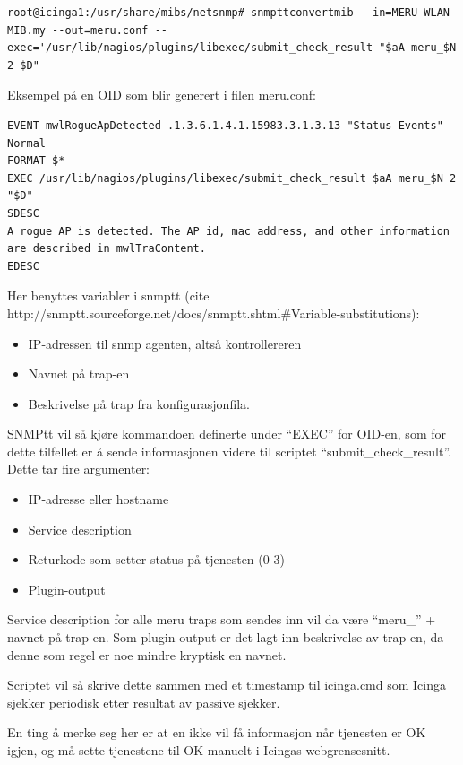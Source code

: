 \begin{lstlisting}
root@icinga1:/usr/share/mibs/netsnmp# snmpttconvertmib --in=MERU-WLAN-MIB.my --out=meru.conf --exec='/usr/lib/nagios/plugins/libexec/submit_check_result "$aA meru_$N 2 $D"
\end{lstlisting}

Eksempel på en OID som blir generert i filen meru.conf:

\begin{lstlisting}
EVENT mwlRogueApDetected .1.3.6.1.4.1.15983.3.1.3.13 "Status Events" Normal
FORMAT $*
EXEC /usr/lib/nagios/plugins/libexec/submit_check_result $aA meru_$N 2 "$D"
SDESC
A rogue AP is detected. The AP id, mac address, and other information are described in mwlTraContent.
EDESC
\end{lstlisting}

Her benyttes variabler i snmptt (cite http://snmptt.sourceforge.net/docs/snmptt.shtml\#Variable-substitutions):
\begin{itemize}
	\item IP-adressen til snmp agenten, altså kontrollereren
	\item Navnet på trap-en
	\item Beskrivelse på trap fra konfigurasjonfila.
\end{itemize}

SNMPtt vil så kjøre kommandoen definerte under “EXEC” for OID-en, som for dette tilfellet er å sende informasjonen videre til scriptet “submit\_check\_result”. Dette tar fire argumenter:

\begin{itemize}
	\item IP-adresse eller hostname 
	\item Service description
	\item Returkode som setter status på tjenesten (0-3)
	\item Plugin-output
\end{itemize}

Service description for alle meru traps som sendes inn vil da være “meru\_” + navnet på trap-en. Som plugin-output er det lagt inn beskrivelse av trap-en, da denne som regel er noe mindre kryptisk en navnet.

Scriptet vil så skrive dette sammen med et timestamp til icinga.cmd som Icinga sjekker periodisk etter resultat av passive sjekker.

En ting å merke seg her er at en ikke vil få informasjon når tjenesten er OK igjen, og må sette tjenestene til OK manuelt i Icingas webgrensesnitt.

